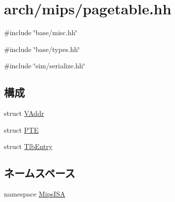 \hypertarget{mips_2pagetable_8hh}{
\section{arch/mips/pagetable.hh}
\label{mips_2pagetable_8hh}
}
{\ttfamily \#include \char`\"{}base/misc.hh\char`\"{}}\par
{\ttfamily \#include \char`\"{}base/types.hh\char`\"{}}\par
{\ttfamily \#include \char`\"{}sim/serialize.hh\char`\"{}}\par
\subsection*{構成}
\begin{DoxyCompactItemize}
\item 
struct \hyperlink{structMipsISA_1_1VAddr}{VAddr}
\item 
struct \hyperlink{structMipsISA_1_1PTE}{PTE}
\item 
struct \hyperlink{structMipsISA_1_1TlbEntry}{TlbEntry}
\end{DoxyCompactItemize}
\subsection*{ネームスペース}
\begin{DoxyCompactItemize}
\item 
namespace \hyperlink{namespaceMipsISA}{MipsISA}
\end{DoxyCompactItemize}
